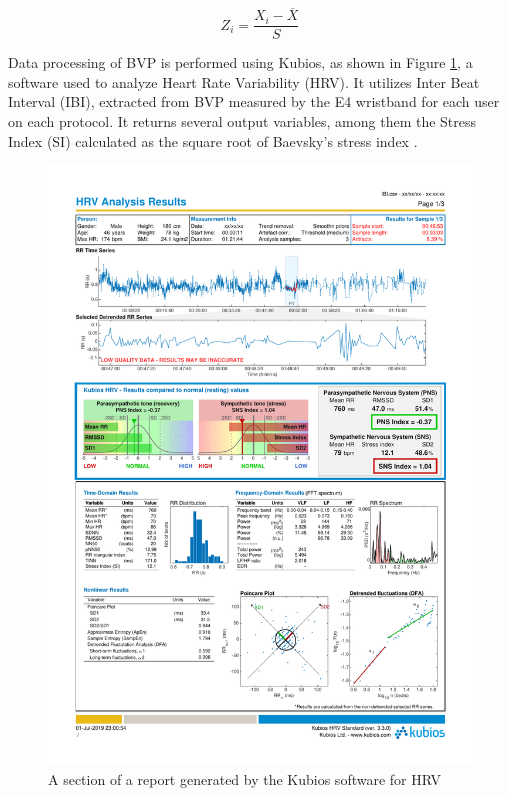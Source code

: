 \begin{equation}\label{eq:zscore}
Z_{i} = \frac{X_{i}-\overline{X}}{S}
\end{equation}

Data processing of BVP is performed using Kubios, as shown in Figure \ref{fig:kubios}, a software used to analyze Heart Rate Variability (HRV)\cite{kubios2017, e4recom2020}. It utilizes Inter Beat Interval (IBI), extracted from BVP measured by the E4 wristband \cite{ibidata2020} for each user on each protocol. It returns several output variables, among them the Stress Index (SI) calculated as the square root of Baevsky's stress index \cite{baevsky2008}.

\begin{figure}[!hbt]
\begin{center}
\includegraphics[width=1\linewidth]{img/cap4/kubios}
\caption{A section of a report generated by the Kubios software for HRV} \label{fig:kubios}
\end{center}
\end{figure}

